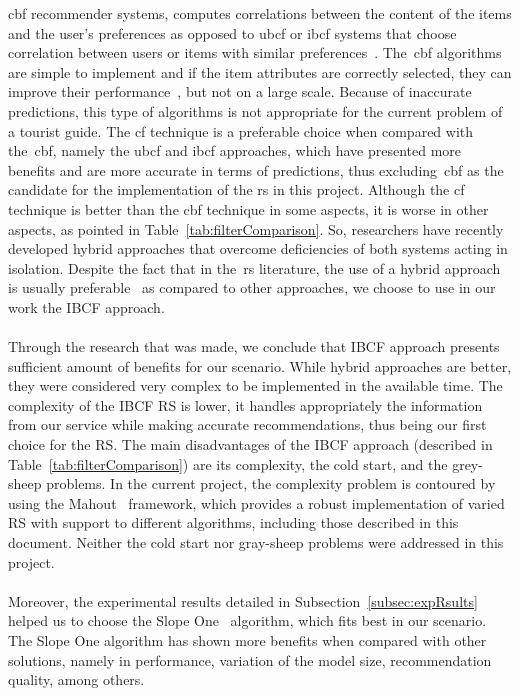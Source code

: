 \gls{cbf} recommender systems, computes correlations between the content of the items and the user's preferences as opposed to \gls{ubcf} or \gls{ibcf} systems that choose correlation between users or items with similar preferences~\cite{content-based-Filtering}. The~\gls{cbf} algorithms are simple to implement and if the item attributes are correctly selected, they can improve their performance~\cite{CBFandCFApproach}, but not on a large scale. Because of inaccurate predictions, this type of algorithms is not appropriate for the current problem of a tourist guide. The \gls{cf} technique is a preferable choice when compared with the~\gls{cbf}, namely the \gls{ubcf} and \gls{ibcf} approaches, which have presented more benefits and are more accurate in terms of predictions, thus excluding~\gls{cbf} as the candidate for the implementation of the \gls{rs} in this project. Although the \gls{cf} technique is better than the \gls{cbf} technique in some aspects, it is worse in other aspects, as pointed in Table~\ref{tab:filterComparison}. So, researchers have recently developed hybrid approaches that overcome deficiencies of both systems acting in isolation. Despite the fact that in the~\gls{rs} literature, the use of a hybrid approach is usually preferable~\cite{rsHybridApproach} as compared to other approaches, we choose to use in our work the IBCF approach.\\
\\
Through the research that was made, we conclude that IBCF approach presents sufficient amount of benefits for our scenario. While hybrid approaches are better, they were considered very complex to be implemented in the available time. The complexity of the IBCF RS is lower, it handles appropriately the information from our service while making accurate recommendations, thus being our first choice for the RS. The main disadvantages of the IBCF approach (described in Table~\ref{tab:filterComparison}) are its complexity, the cold start, and the grey-sheep problems. In the current project, the complexity problem is contoured by using the Mahout~\cite{apacheMahout} framework, which provides a robust implementation of varied RS with support to different algorithms, including those described in this document. Neither the cold start nor gray-sheep problems were addressed in this project.\\
\\
Moreover, the experimental results detailed in Subsection~\ref{subsec:expRsults} helped us to choose
the Slope One~\cite{slopeOne} algorithm, which fits best in our scenario. The Slope One algorithm has shown more benefits when compared with other solutions, namely in performance, variation of the model size, recommendation quality, among others.\\
